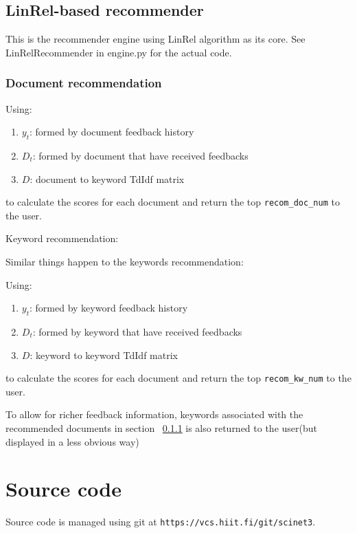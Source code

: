 \documentclass[10pt,a4paper]{article}
\begin{document}
\subsection{LinRel-based recommender}

This is the recommender engine using LinRel algorithm as its core. See LinRelRecommender in engine.py for the actual code.

\subsubsection{Document recommendation}
\label{linrel-doc-recom}

Using:
\begin{enumerate}
\item $y_t$: formed by document feedback history
\item $D_t$: formed by document that have received feedbacks
\item $D$: document to keyword TdIdf matrix 
\end{enumerate}
to calculate the scores for each document and return the top \verb+recom_doc_num+ to the user.


Keyword recommendation:

Similar things happen to the keywords recommendation:

Using:
\begin{enumerate}
\item $y_t$: formed by keyword feedback history
\item $D_t$: formed by keyword that have received feedbacks
\item $D$: keyword to keyword TdIdf matrix 
\end{enumerate}

to calculate the scores for each document and return the top \verb+recom_kw_num+ to the user.

To allow for richer feedback information, keywords associated with the recommended documents in section ~\ref{linrel-doc-recom} is also returned to the user(but displayed in a less obvious way)

\section{Source code}

Source code is managed using git at \verb+https://vcs.hiit.fi/git/scinet3+.

\newpage 

\listoffigures
\newpage
\listoftables
\newpage
\end{document}
